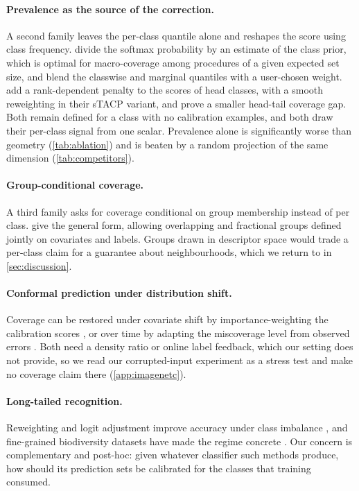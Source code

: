 \paragraph{Prevalence as the source of the correction.} A second family leaves the per-class
quantile alone and reshapes the score using class frequency. \citet{ding2026conformal} divide
the softmax probability by an estimate of the class prior, which is optimal for macro-coverage
among procedures of a given expected set size, and blend the classwise and marginal quantiles
with a user-chosen weight. \citet{liu2026tail} add a rank-dependent penalty to the scores of
head classes, with a smooth reweighting in their sTACP variant, and prove a smaller head-tail
coverage gap. Both remain defined for a class with no calibration examples, and both draw their
per-class signal from one scalar. Prevalence alone is significantly worse than geometry
(\cref{tab:ablation}) and is beaten by a random projection of the same dimension
(\cref{tab:competitors}).

\paragraph{Group-conditional coverage.} A third family asks for coverage conditional on group
membership instead of per class. \citet{bairaktari2025kandinsky} give the general form,
allowing overlapping and fractional groups defined jointly on covariates and labels. Groups
drawn in descriptor space would trade a per-class claim for a guarantee about neighbourhoods,
which we return to in \cref{sec:discussion}.

\paragraph{Conformal prediction under distribution shift.} Coverage can be restored under
covariate shift by importance-weighting the calibration scores \cite{tibshirani2019conformal},
or over time by adapting the miscoverage level from observed errors \cite{gibbs2021adaptive}.
Both need a density ratio or online label feedback, which our setting does not provide, so
we read our corrupted-input experiment as a stress test and make no coverage claim there
(\cref{app:imagenetc}).

\paragraph{Long-tailed recognition.} Reweighting and logit adjustment improve accuracy under
class imbalance \cite{menon2021long}, and fine-grained biodiversity datasets have made the
regime concrete \cite{garcin2021plantnet,vanhorn2018inaturalist}. Our concern is complementary
and post-hoc: given whatever classifier such methods produce, how should its prediction sets
be calibrated for the classes that training consumed.
